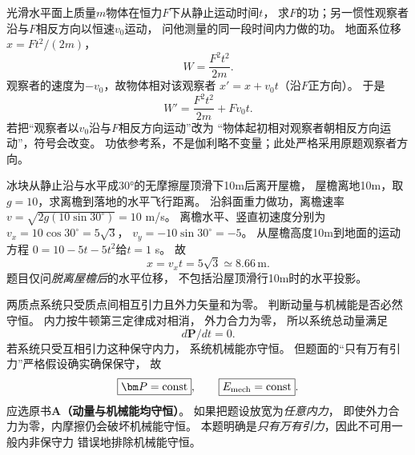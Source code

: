 \problemtext 光滑水平面上质量$m$物体在恒力$F$下从静止运动时间$t$，
求$F$的功；另一惯性观察者沿与$F$相反方向以恒速$v_0$运动，
问他测量的同一段时间内力做的功。
\workings
地面系位移$x=Ft^2/(2m)$，
\[
\boxed{W=\frac{F^2t^2}{2m}}.
\]
观察者的速度为$-v_0$，故物体相对该观察者
$x'=x+v_0t$（沿$F$正方向）。
于是
\[
\boxed{W'=\frac{F^2t^2}{2m}+Fv_0t}.
\]
\crosscheck 若把“观察者以$v_0$沿与$F$相反方向运动”改为
“物体起初相对观察者朝相反方向运动”，符号会改变。
功依参考系，不是伽利略不变量；此处严格采用原题观察者方向。

\problemtext 冰块从静止沿与水平成30°的无摩擦屋顶滑下10m后离开屋檐，
屋檐离地10m，取$g=10$，求离檐到落地的水平飞行距离。
\workings
沿斜面重力做功，离檐速率
$v=\sqrt{2g(10\sin30^\circ)}=10$ m/s。
离檐水平、竖直初速度分别为
$v_x=10\cos30^\circ=5\sqrt3$，
$v_y=-10\sin30^\circ=-5$。
从屋檐高度10m到地面的运动方程
$0=10-5t-5t^2$给$t=1$ s。
故
\[
\boxed{x=v_xt=5\sqrt3\simeq8.66\,\mathrm m}.
\]
\crosscheck 题目仅问\emph{脱离屋檐后}的水平位移，
不包括沿屋顶滑行10m时的水平投影。

\problemtext 两质点系统只受质点间相互引力且外力矢量和为零。
判断动量与机械能是否必然守恒。
\workings
内力按牛顿第三定律成对相消，
外力合力为零，
所以系统总动量满足
\[
\boxed{d\bm P/dt=0}.
\]
若系统只受互相引力这种保守内力，
系统机械能亦守恒。
但题面的“只有万有引力”严格假设确实确保保守，
故
\[
\boxed{\bm P=\mathrm{const}},\qquad
\boxed{E_{\rm mech}=\mathrm{const}}.
\]
应选原书\textbf{A（动量与机械能均守恒）}。
\crosscheck 如果把题设放宽为\emph{任意内力}，
即使外力合力为零，内摩擦仍会破坏机械能守恒。
本题明确是\emph{只有万有引力}，因此不可用一般内非保守力
错误地排除机械能守恒。
